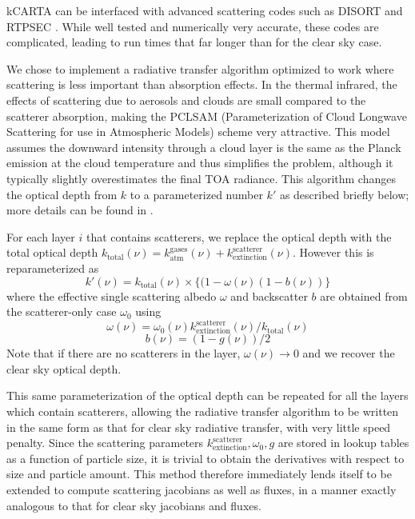 \documentclass[11pt]{article}
\newcommand{\kc}{\textsf{kCARTA}\xspace}
\begin{document}
\kc can be interfaced with advanced scattering codes such as DISORT
\cite{stam:88} and RTPSEC \cite{dee:98}. While well tested and
numerically very accurate, these codes are complicated, leading to run
times that far longer than for the clear sky case.

We chose to implement a radiative transfer algorithm optimized to work
where scattering is less important than absorption effects. In the
thermal infrared, the effects of scattering due to aerosols and clouds
are small compared to the scatterer absorption, making the
\textsf{PCLSAM} (Parameterization of Cloud Longwave Scattering for use
in Atmospheric Models) scheme \cite{cho:99} very attractive. This
model assumes the downward intensity through a cloud layer is the same
as the Planck emission at the cloud temperature and thus simplifies
the problem, although it typically slightly overestimates the final
TOA radiance. This algorithm changes the optical depth from $k$ to a
parameterized number $k\prime$ as described briefly below; more
details can be found in \cite{cho:99,mat:05}.

For each layer $i$ that contains scatterers, we replace the optical
depth with the total optical depth $k_{\text{total}}(\nu) =
k_{\text{atm}}^{\text{gases}}(\nu) +
k^{\text{scatterer}}_{\text{extinction}}(\nu)$.  However this is
reparameterized as
\[
k\prime(\nu) = k_{\text{total}}(\nu) \times \{ (1-\omega(\nu)
(1-b(\nu)) \}
\]
where the effective single scattering albedo $\omega$ and backscatter
$b$ are obtained from the scatterer-only case $\omega_{0}$ using
\[
\omega(\nu) = \omega_{0}(\nu)
k^{\text{scatterer}}_{\text{extinction}}(\nu)/k_{\text{total}}(\nu)
\]
\[
b(\nu) = (1 - g(\nu))/2
\]
Note that if there are no scatterers in the layer, $\omega(\nu)
\rightarrow 0$ and we recover the clear sky optical depth.

This same parameterization of the optical depth can be repeated for
all the layers which contain scatterers, allowing the radiative
transfer algorithm to be written in the same form as that for clear
sky radiative transfer, with very little speed penalty. Since the
scattering parameters
$k^{\text{scatterer}}_{\text{extinction}},\omega_{0},g$ are stored in
lookup tables as a function of particle size, it is trivial to obtain
the derivatives with respect to size and particle amount. This method
therefore immediately lends itself to be extended to compute
scattering jacobians as well as fluxes, in a manner exactly analogous
to that for clear sky jacobians and fluxes.
\end{document}
